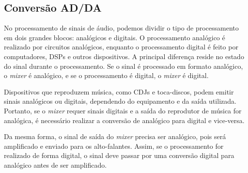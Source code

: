 \subsection{Conversão AD/DA}

No processamento de sinais de áudio, podemos dividir o tipo de processamento em dois grandes blocos: analógicos e digitais. O processamento analógico é realizado por circuitos analógicos, enquanto o processamento digital é feito por computadores, DSPs e outros dispositivos. A principal diferença reside no estado do sinal durante o processamento. Se o sinal é processado em formato analógico, o \textit{mixer} é analógico, e se o processamento é digital, o \textit{mixer} é digital.

Dispositivos que reproduzem música, como CDJs e toca-discos, podem emitir sinais analógicos ou digitais, dependendo do equipamento e da saída utilizada. Portanto, se o \textit{mixer} requer sinais digitais e a saída do reprodutor de música for analógica, é necessário realizar a conversão de analógico para digital e vice-versa.

Da mesma forma, o sinal de saída do \textit{mixer} precisa ser analógico, pois será amplificado e enviado para os alto-falantes. Assim, se o processamento for realizado de forma digital, o sinal deve passar por uma conversão digital para analógico antes de ser amplificado.
